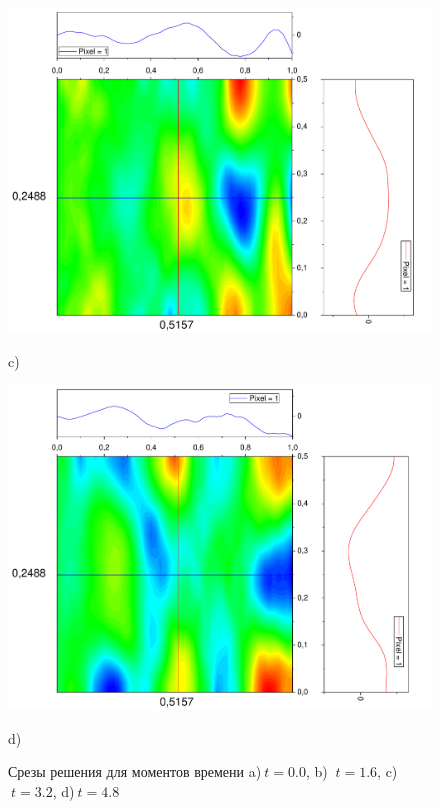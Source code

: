\documentclass[a4paper,12pt]{article}
\begin{document}
\begin{figure}[h!]
\begin{center}
\begin{minipage}[h]{0.24\linewidth}
		\end{minipage}
		\begin{minipage}[h]{0.24\linewidth}
			\includegraphics[width=\textwidth]{graphs/graphs_a/v1/wave_t-16_v1_srez} \begin{center}	c)	\end{center}
		\end{minipage}
		\begin{minipage}[h]{0.24\linewidth}
			\includegraphics[width=\textwidth]{graphs/graphs_a/v1/wave_t-24_v1_srez} \begin{center}	d)	\end{center}
		\end{minipage}
	\end{center}
	\caption{Срезы решения для моментов времени a)$\ t = 0.0$, b) $\ t = 1.6$, c)$\ t = 3.2$, d)$\ t = 4.8$}
\end{figure}
\end{document}
